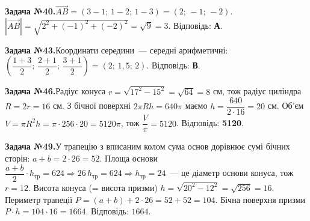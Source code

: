 \documentclass[12pt]{article}
\begin{document}
\par\vspace{0.3cm}\noindent\hypertarget{sol:40}{}
\begin{tcolorbox}[colback=titleBg!40, colframe=mainGreen!55, boxrule=0.4pt, arc=2pt, left=6pt, right=6pt, top=4pt, bottom=4pt, breakable]
\noindent\small\textbf{Задача №40.}\quad $\overrightarrow{AB}=(3-1;\,1-2;\,1-3)=(2;\,-1;\,-2)$. $|\overrightarrow{AB}|=\sqrt{2^2+(-1)^2+(-2)^2}=\sqrt{9}=3$. Відповідь: \textbf{А}.
\par\vspace{0.1cm}\hfill\hyperlink{task:40}{}
\end{tcolorbox}
\par\vspace{0.3cm}\noindent\hypertarget{sol:43}{}
\begin{tcolorbox}[colback=titleBg!40, colframe=mainGreen!55, boxrule=0.4pt, arc=2pt, left=6pt, right=6pt, top=4pt, bottom=4pt, breakable]
\noindent\small\textbf{Задача №43.}\quad Координати середини~--- середні арифметичні: $\left(\dfrac{1+3}{2};\,\dfrac{2+1}{2};\,\dfrac{3+1}{2}\right)=(2;\,1{,}5;\,2)$. Відповідь: \textbf{В}.
\par\vspace{0.1cm}\hfill\hyperlink{task:43}{}
\end{tcolorbox}
\par\vspace{0.3cm}\noindent\hypertarget{sol:46}{}
\begin{tcolorbox}[colback=titleBg!40, colframe=mainGreen!55, boxrule=0.4pt, arc=2pt, left=6pt, right=6pt, top=4pt, bottom=4pt, breakable]
\noindent\small\textbf{Задача №46.}\quad Радіус конуса $r=\sqrt{17^2-15^2}=\sqrt{64}=8$ см, тож радіус циліндра $R=2r=16$ см. З бічної поверхні $2\pi R h=640\pi$ маємо $h=\dfrac{640}{2\cdot 16}=20$ см. Об'єм $V=\pi R^2 h=\pi\cdot 256\cdot 20=5120\pi$, тож $\dfrac{V}{\pi}=5120$. Відповідь: \textbf{5120}.
\par\vspace{0.1cm}\hfill\hyperlink{task:46}{}
\end{tcolorbox}
\par\vspace{0.3cm}\noindent\hypertarget{sol:49}{}
\begin{tcolorbox}[colback=titleBg!40, colframe=mainGreen!55, boxrule=0.4pt, arc=2pt, left=6pt, right=6pt, top=4pt, bottom=4pt, breakable]
\noindent\small\textbf{Задача №49.}\quad У трапецію з вписаним колом сума основ дорівнює сумі бічних сторін: $a+b=2\cdot26=52$. Площа основи $\dfrac{a+b}{2}\cdot h_{\text{тр}}=624\Rightarrow 26\,h_{\text{тр}}=624\Rightarrow h_{\text{тр}}=24$~--- це діаметр основи конуса, тож $r=12$. Висота конуса (= висота призми) $h=\sqrt{20^2-12^2}=\sqrt{256}=16$. Периметр трапеції $P=(a+b)+2\cdot26=52+52=104$. Бічна поверхня призми $P\cdot h=104\cdot16=1664$. Відповідь: $1664$.
\par\vspace{0.1cm}\hfill\hyperlink{task:49}{}
\end{tcolorbox}
\end{document}

